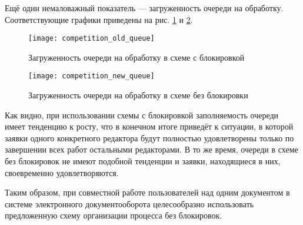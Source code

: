\vspace{\baselineskip}
Ещё один немаловажный показатель --- загруженность очереди на обработку. Соответствующие графики приведены на рис. \ref{img:competition_old_queue} и \ref{img:competition_new_queue}.

\begin{figure}[h!]
  \centering
  \texttt{[image: competition\_old\_queue]}
  \caption{Загруженность очереди на обработку в схеме с блокировкой}
  \label{img:competition_old_queue}
\end{figure}

\begin{figure}[h!]
  \centering
  \texttt{[image: competition\_new\_queue]}
  \caption{Загруженность очереди на обработку в схеме без блокировки}
  \label{img:competition_new_queue}
\end{figure}
\FloatBarrier
\vspace{\baselineskip}
Как видно, при использовании схемы с блокировкой заполняемость очереди имеет тенденцию к росту, что в конечном итоге приведёт к ситуации, в которой заявки одного конкретного редактора будут полностью удовлетворены только по завершении всех работ остальными редакторами. В то же время, очереди в схеме без блокировок не имеют подобной тенденции и заявки, находящиеся в них, своевременно удовлетворяются.

\vspace{\baselineskip}
Таким образом, при совместной работе пользователей над одним документом в системе электронного документооборота целесообразно использовать предложенную схему организации процесса без блокировок.